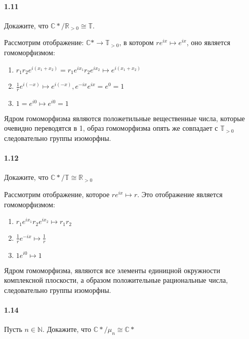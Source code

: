 \documentclass[a4paper,12pt]{article}
\begin{document}
\paragraph{1.11} Докажите, что ${\mathbb{C}*}/{\mathbb{R}_{>0}} \cong \mathbb{T}$.

\begin{Solution}
Рассмотрим отображение: $\mathbb{C}* \rightarrow \mathbb{T}_{>0}$, в котором $re^{ix} \mapsto e^{ix}$, оно является гомоморфизмом:
\begin{enumerate}
\item $r_1 r_2 e^{i \left(x_1 + x_2\right)} = r_1 e^{i x_1} r_2 e^{i x_2} \mapsto e^{i \left(x_1 + x_2\right)}$

\item $\frac{1}{r} e^{i \left(-x\right)} \mapsto e^{i \left(-x\right)}, e^{- i x} e^{i x} = e^0 = 1$

\item $1 = e^{i 0} \mapsto e^{i 0} = 1$
\end{enumerate}
Ядром гомоморфизма являются положетильные вещественные числа, которые очевидно переводятся в 1, образ гомоморфизма опять же совпадает с $\mathbb{T}_{>0}$следовательно группы изоморфны.
\end{Solution}

\paragraph{1.12} Докажите, что ${\mathbb{C}*}/\mathbb{T} \cong \mathbb{R}_{>0}$

\begin{Solution}
Рассмотрим отображение, которое $r e^{i x} \mapsto r$. Это отображение является гомоморфизмом:
\begin{enumerate}
\item $r_1 e^{i x_1} r_2 e^{i x_2} \mapsto r_1 r_2$

\item $\frac{1}{r} e^{- i x} \mapsto \frac{1}{r}$

\item $1 e^{i 0} \mapsto 1$
\end{enumerate}
Ядром гомоморфизма, являются все элементы единицной окружности комплексной плоскости, а образом положительные рациональные числа, следовательно группы изоморфны.
\end{Solution}

\paragraph{1.14} Пусть $n \in \mathbb{N}$. Докажите, что ${\mathbb{C}*}/{\mu_{n}} \cong \mathbb{C}*$
\end{document}
